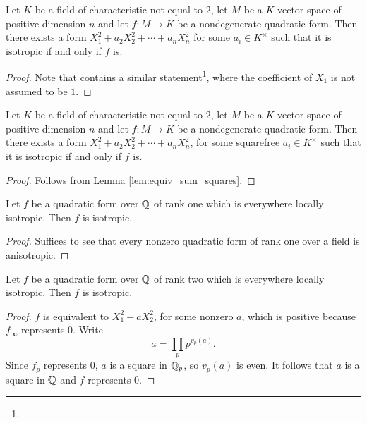 \begin{lemma}\label{lem:equiv_sum_squares}
\leanok
Let $K$ be a field of characteristic not equal to $2$, let $M$ be a $K$-vector space of positive dimension $n$ and let $f : M \to K$ be a
nondegenerate quadratic form. Then there exists a form $X_1^2 +  a_2X_2^2 + \cdots + a_nX_n^2$ for some $a_i \in K^\times$ such that it is isotropic if and only if $f$ is.
\end{lemma}
\begin{proof}
\leanok
Note that \mathlib contains a similar statement\footnote{}, where the coefficient of $X_1$ is not assumed to be $1$.
\end{proof}

\begin{lemma}\label{lem:equiv_sum_squares_sqfree}
	\leanok
	Let $K$ be a field of characteristic not equal to $2$, let $M$ be a $K$-vector space of positive dimension $n$ and let $f : M \to K$ be a
	nondegenerate quadratic form. Then there exists a form $X_1^2 +  a_2X_2^2 + \cdots + a_nX_n^2$, for some squarefree $a_i \in K^\times$ such that it is isotropic if and only if $f$ is.
\end{lemma}
\begin{proof}
\leanok
Follows from Lemma \ref{lem:equiv_sum_squares}.
\end{proof}

\begin{lemma}\label{lem:isotr_of_rk_one}
	\leanok
	Let $f$ be a quadratic form over $\mathbb{Q}$ of rank one which is everywhere locally isotropic. Then $f$ is isotropic.
\end{lemma}
\begin{proof}
\leanok
Suffices to see that every nonzero quadratic form of rank one over a field is anisotropic.
\end{proof}

\begin{lemma}\label{lem:isotr_of_rk_two}
	\leanok
	Let $f$ be a quadratic form over $\mathbb{Q}$ of rank two which is everywhere locally isotropic. Then $f$ is isotropic.
\end{lemma}
\begin{proof}
\leanok
$f$ is equivalent to $X_1^2 - aX_2^2$, for some nonzero $a$, which is positive because $f_\infty$ represents $0$. Write
\[ a = \prod_p p^{v_p(a)}.\]
Since $f_p$ represents $0$, $a$ is a square in $\mathbb{Q}_p$, so $v_p(a)$ is even. It follows that $a$ is a square in $\mathbb{Q}$ and $f$ represents $0$.
\end{proof}

